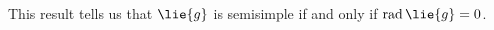 \documentclass[fleqn]{NotesClass}
\DeclareMathOperator{\rad}{rad}
\begin{document}
    This result tells us that \(\lie{g}\) is semisimple if and only if \(\rad \lie{g} = 0\).
    
    
	
%	
	
\end{document}
